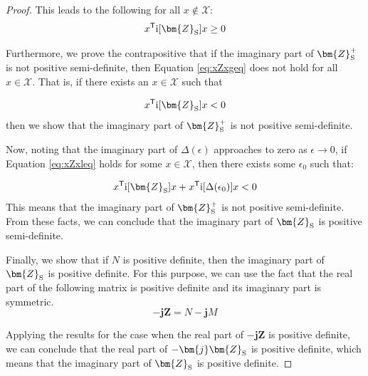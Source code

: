 \documentclass[graybox, envcountchap]{svmult}
\begin{document}
\begin{proof}
This leads to the following for all $x \notin \mathcal{X}$:
\begin{equation}\label{eq:xZxgeq}
  x^{\sf T}\imag[\bm{Z}_{\rm S}] x \geq 0
\end{equation}

Furthermore, we prove the contrapositive that if the imaginary part of $
\bm{Z}_{\rm S}^{+} $ is not positive semi-definite, then Equation
\ref{eq:xZxgeq} does not hold for all $x \in \mathcal{X}$. That is, if there
exists an $x \in \mathcal{X}$ such that 

\begin{equation}\label{eq:xZxleq}
  x^{\sf T} \imag[\bm{Z}_{\rm S}] x < 0
\end{equation}
then we show that the imaginary part of $ \bm{Z}_{\rm S}^{+} $ is not positive
semi-definite. 

Now, noting that the imaginary part of $ \Delta(\epsilon)$ approaches to zero as
$\epsilon \rightarrow 0$, if Equation \ref{eq:xZxleq} holds for some $x \in
\mathcal{X}$, then there exists some $\epsilon_0$ such that:

\begin{equation*}
x^{\sf T} \imag[ \bm{Z}_{\rm S}] x 
+
x^{\sf T} \imag[\Delta(\epsilon_0)]x < 0
\end{equation*}
This means that the imaginary part of $\bm{Z}_{\rm S}^{+} $ is not positive
semi-definite. From these facts, we can conclude that the imaginary part of
$\bm{Z}_{\rm S}$ is positive semi-definite.

Finally, we show that if $N$ is positive definite, then the imaginary part of
$\bm{Z}_{\rm S}$ is positive definite. For this purpose, we can use the fact
that the real part of the following matrix is positive definite and its
imaginary part is symmetric.
\begin{equation*}
-\bm{j} \bm{Z} = N - \bm{j} M
\end{equation*}

Applying the results for the case when the real part of $-\bm{j} \bm{Z}$ is
positive definite, we can conclude that the real part of $-\bm{j} \bm{Z}_{\rm
S}$ is positive definite, which means that the imaginary part of $\bm{Z}_{\rm
S}$ is positive definite.
\end{proof}


\end{document}
